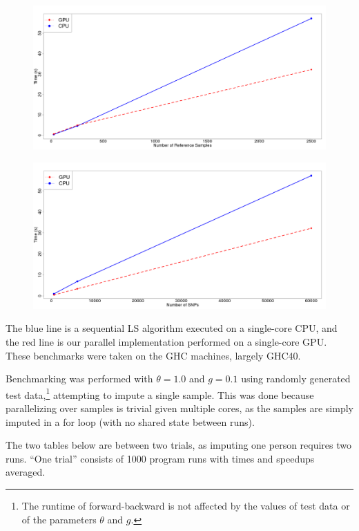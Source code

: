 \documentclass[12pt]{article}
\begin{document}
{
\begin{figure}[!hb]
  \includegraphics[scale=0.2]{sample}
\end{figure}
\begin{figure}[!hb]
  \includegraphics[scale=0.2]{snp}
\end{figure}
}

The blue line is a sequential LS algorithm executed on a single-core CPU, and
the red line is our parallel implementation performed on a single-core GPU.
These benchmarks were taken on the GHC machines, largely GHC40.

Benchmarking was performed with $\theta = 1.0$ and $g = 0.1$ using randomly
generated test data,\footnote{The runtime of forward-backward is not affected by the values of test data or of the parameters $\theta$ and $g$.} attempting to impute a single sample. This was done
because parallelizing over samples is trivial given multiple cores, as the
samples are simply imputed in a for loop (with no shared state between runs).

The two tables below are between two trials, as imputing one
person requires two runs. ``One trial'' consists of 1000 program runs with
times and speedups averaged.

\end{document}
